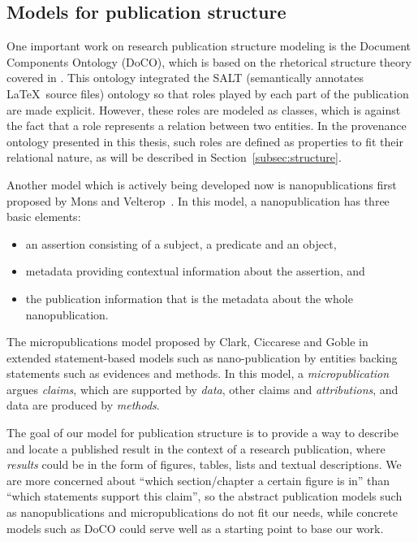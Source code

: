 \subsection{Models for publication structure}
One important work on research publication structure modeling is the Document Components Ontology (DoCO), which is based on the rhetorical structure theory covered in \cite{taboada2006rhetorical}. This ontology integrated the SALT \cite{groza2007salt} (semantically annotates \LaTeX \ source files) ontology so that roles played by each part of the publication are made explicit. However, these roles are modeled as classes, which is against the fact that a role represents a relation between two entities. In the provenance ontology presented in this thesis, such roles are defined as properties to fit their relational nature, as will be described in Section~\ref{subsec:structure}.

Another model which is actively being developed now is nanopublications first proposed by Mons and Velterop~\cite{mons2009nano}. In this model, a nanopublication has three basic elements:
\begin{itemize}
	\item an assertion consisting of a subject, a predicate and an object,
	\item metadata providing contextual information about the assertion, and
	\item the publication information that is the metadata about the whole nanopublication.
\end{itemize}

The micropublications model proposed by Clark, Ciccarese and Goble in \cite{clark2013micropublications} extended statement-based models such as nano-publication by entities backing statements such as evidences and methods. In this model, a \emph{micropublication} argues \emph{claims}, which are supported by \emph{data}, other claims and \emph{attributions}, and data are produced by \emph{methods}.

The goal of our model for publication structure is to provide a way to describe and locate a published result in the context of a research publication, where \emph{results} could be in the form of figures, tables, lists and textual descriptions. We are more concerned about ``which section/chapter a certain figure is in'' than ``which statements support this claim'', so the abstract publication models such as nanopublications and micropublications do not fit our needs, while concrete models such as DoCO could serve well as a starting point to base our work.

